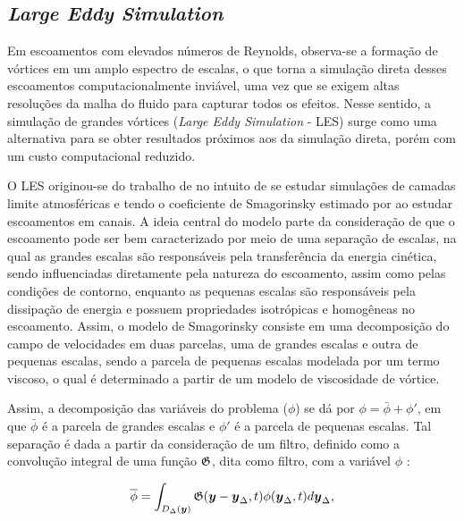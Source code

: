 \subsection{\textit{Large Eddy Simulation}} \label{LES}

Em escoamentos com elevados números de Reynolds, observa-se a formação de vórtices em um amplo espectro de escalas, o que torna a simulação direta desses escoamentos computacionalmente inviável, uma vez que se exigem altas resoluções da malha do fluido para capturar todos os efeitos. Nesse sentido, a simulação de grandes vórtices (\textit{Large Eddy Simulation} - LES) surge como uma alternativa para se obter resultados próximos aos da simulação direta, porém com um custo computacional reduzido.

O LES originou-se do trabalho de  no intuito de se estudar simulações de camadas limite atmosféricas e tendo o coeficiente de Smagorinsky estimado por  ao estudar escoamentos em canais. A ideia central do modelo parte da consideração de que o escoamento pode ser bem caracterizado por meio de uma separação de escalas, na qual as grandes escalas são responsáveis pela transferência da energia cinética, sendo influenciadas diretamente pela natureza do escoamento, assim como pelas condições de contorno, enquanto as pequenas escalas são responsáveis pela dissipação de energia e possuem propriedades isotrópicas e homogêneas no escoamento. Assim, o modelo de Smagorinsky consiste em uma decomposição do campo de velocidades em duas parcelas, uma de grandes escalas e outra de pequenas escalas, sendo a parcela de pequenas escalas modelada por um termo viscoso, o qual é determinado a partir de um modelo de viscosidade de vórtice.

Assim, a decomposição das variáveis do problema ($\phi$) se dá por $\phi=\bar{\phi}+\phi'$, em que $\bar{\phi}$ é a parcela de grandes escalas e $\phi'$ é a parcela de pequenas escalas. Tal separação é dada a partir da consideração de um filtro, definido como a convolução integral de uma função $\mathfrak{G}$, dita como filtro, com a variável $\phi$ \cite{germano1991dynamic,hughes2000large,moeng2015large,katopodes2019free}:

\begin{equation}
    \overline{\phi}=\int_{D_\Delta(\boldsymbol{y})}{\mathfrak{G}(\boldsymbol{y}-\boldsymbol{y}_\Delta,t)\phi(\boldsymbol{y}_\Delta,t)d\boldsymbol{y}_\Delta}\text{,}
\end{equation}

